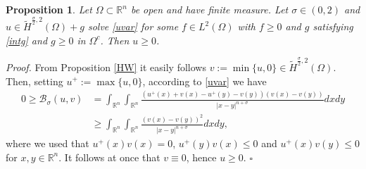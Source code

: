 \documentclass[11pt, a4paper]{article}
\newtheorem{prop}[trm]{Proposition}
\newcommand{\R}{\mathbb{R}}
\newcommand{\M}[1]{\mathcal{#1}}
\newenvironment{proof}{\noindent\emph{Proof.}}{\phantom{ } \hfill$\square$\medskip}
\begin{document}
\begin{prop}\label{maxprinc2} Let $\Omega\subset\R^n$ be open and have finite measure. Let $\sigma\in (0,2)$ and $u\in \tilde H^{\frac\sigma2,2}(\Omega)+g$ solve \eqref{uvar} for some $f\in L^2(\Omega)$ with $f\ge 0$ and $g$ satisfying \eqref{intg} and $g\ge 0$ in $\Omega^c$. Then $u\ge 0$.
\end{prop}

\begin{proof} From Proposition \ref{HW} it easily follows $v:=\min\{u,0\}\in \tilde H^{\frac\sigma2,2}(\Omega)$. Then, setting $u^+:=\max\{u,0\}$, according to \eqref{uvar} we have
\[\begin{split}
0\ge \M{B}_\sigma(u,v)&=\int_{\R^n{}}\int_{\R^n{}} \frac{(u^+(x)+v(x)-u^+(y)-v(y))(v(x)-v(y))}{|x-y|^{n+\sigma}}dxdy\\
&\ge\int_{\R^n}\int_{\R^n} \frac{(v(x)-v(y))^2}{|x-y|^{n+\sigma}}dxdy,
\end{split}\]
where we used that $u^+(x)v(x)=0$, $u^+(y)v(x)\le 0$ and $u^+(x)v(y)\le 0$ for $x,y\in\R^n$. It follows at once that $v\equiv 0$, hence $u\ge 0$.
\end{proof}
\end{document}
